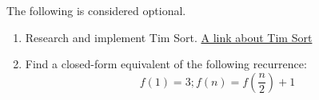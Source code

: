 \documentclass[11pt]{article}
\begin{document}
The following is considered optional.

\begin{enumerate}
    
    \item Research and implement Tim Sort. \href{https://en.wikipedia.org/wiki/Timsort}{A link about Tim Sort}

    \item Find a closed-form equivalent of the following recurrence:
    $$f(1) = 3; f(n) = f(\frac{n}{2}) + 1$$

\end{enumerate}

\label{r:lastpage}
\end{document}
